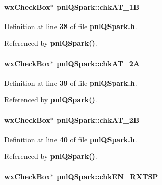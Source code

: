 \paragraph[{chk\+A\+T\+\_\+1B}]{\setlength{\rightskip}{0pt plus 5cm}wx\+Check\+Box$\ast$ pnl\+Q\+Spark\+::chk\+A\+T\+\_\+1B}\label{classpnlQSpark_a57101190097a3efe4f05b0ddd5c855c8}


Definition at line {\bf 38} of file {\bf pnl\+Q\+Spark.\+h}.



Referenced by {\bf pnl\+Q\+Spark()}.

\paragraph[{chk\+A\+T\+\_\+2A}]{\setlength{\rightskip}{0pt plus 5cm}wx\+Check\+Box$\ast$ pnl\+Q\+Spark\+::chk\+A\+T\+\_\+2A}\label{classpnlQSpark_a34b5172c6f67435bf8c5afbcc1b90e10}


Definition at line {\bf 39} of file {\bf pnl\+Q\+Spark.\+h}.



Referenced by {\bf pnl\+Q\+Spark()}.

\paragraph[{chk\+A\+T\+\_\+2B}]{\setlength{\rightskip}{0pt plus 5cm}wx\+Check\+Box$\ast$ pnl\+Q\+Spark\+::chk\+A\+T\+\_\+2B}\label{classpnlQSpark_a33da7772cf50092cd42eee3c9e4d3ded}


Definition at line {\bf 40} of file {\bf pnl\+Q\+Spark.\+h}.



Referenced by {\bf pnl\+Q\+Spark()}.

\paragraph[{chk\+E\+N\+\_\+\+R\+X\+T\+SP}]{\setlength{\rightskip}{0pt plus 5cm}wx\+Check\+Box$\ast$ pnl\+Q\+Spark\+::chk\+E\+N\+\_\+\+R\+X\+T\+SP}\label{classpnlQSpark_a6a2ea1c55dc013e6d980323e7c5c7121}


